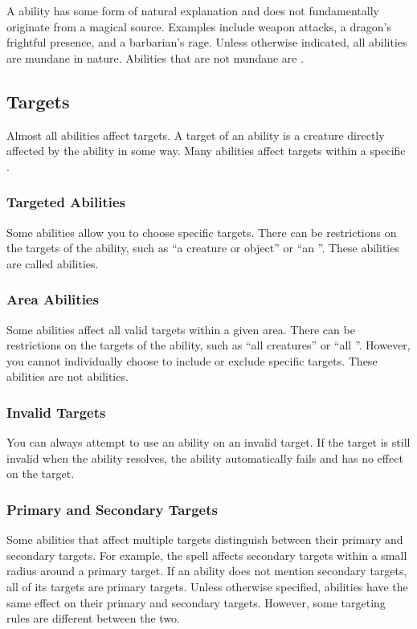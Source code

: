         \label{Mundane Abilities} A  ability has some form of natural explanation and does not fundamentally originate from a magical source.
        Examples include weapon attacks, a dragon's frightful presence, and a barbarian's rage.
        Unless otherwise indicated, all abilities are mundane in nature.
        Abilities that are not mundane are \magical.

    \subsection{Targets}\label{Targets}
        Almost all abilities affect targets.
        A target of an ability is a creature directly affected by the ability in some way.
        Many abilities affect targets within a specific .

        \subsubsection{Targeted Abilities}\label{Targeted Abilities}
            Some abilities allow you to choose specific targets.
            There can be restrictions on the targets of the ability, such as ``a creature or object'' or ``an ''.
            These abilities are called  abilities.

        \subsubsection{Area Abilities}
            Some abilities affect all valid targets within a given area.
            There can be restrictions on the targets of the ability, such as ``all creatures'' or ``all ''.
            However, you cannot individually choose to include or exclude specific targets.
            These abilities are not  abilities.

        \subsubsection{Invalid Targets}
            You can always attempt to use an ability on an invalid target.
            If the target is still invalid when the ability resolves, the ability automatically fails and has no effect on the target.

        \subsubsection{Primary and Secondary Targets}\label{Primary and Secondary Targets}
            Some abilities that affect multiple targets distinguish between their primary and secondary targets.
            For example, the  spell affects secondary targets within a small radius around a primary target.
            If an ability does not mention secondary targets, all of its targets are primary targets.
            Unless otherwise specified, abilities have the same effect on their primary and secondary targets.
            However, some targeting rules are different between the two.

